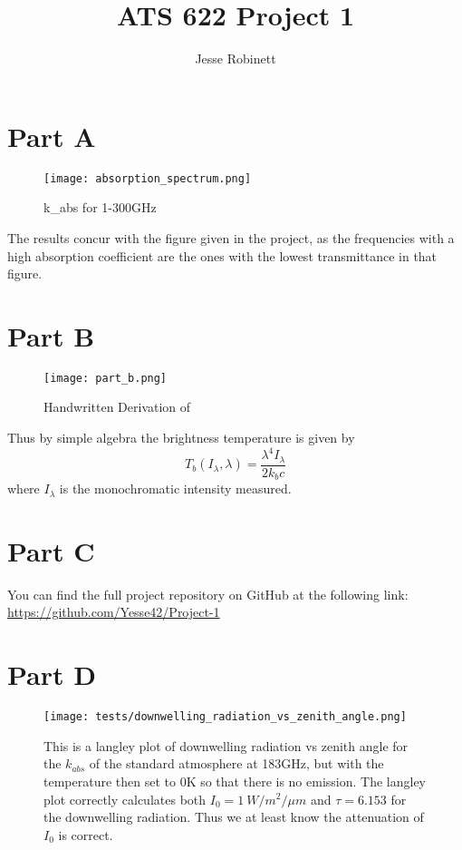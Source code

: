\documentclass{article}
\title{ATS 622 Project 1}
\author{Jesse Robinett}
\begin{document}
\maketitle

\section*{Part A}

\begin{figure}[H]
	\texttt{[image: absorption\_spectrum.png]}
    \caption{k\_abs for 1-300GHz}
\end{figure}

The results concur with the figure given in the project, as the frequencies with a high absorption coefficient are the ones with the lowest transmittance in that figure.

\section*{Part B}

\begin{figure}[H]
	\texttt{[image: part\_b.png]}
    \caption{Handwritten Derivation of }
\end{figure}

Thus by simple algebra the brightness temperature is given by $$ T_b(I_\lambda, \lambda) = \frac{\lambda^4 I_\lambda}{2k_bc}$$ where $ I_\lambda $ is the monochromatic intensity measured.

\section*{Part C}

You can find the full project repository on GitHub at the following link: 
\href{https://github.com/Yesse42/Project-1}{https://github.com/Yesse42/Project-1}

\section*{Part D}

\begin{figure}[H]
    \texttt{[image: tests/downwelling\_radiation\_vs\_zenith\_angle.png]}
    \caption{This is a langley plot of downwelling radiation vs zenith angle for the $k_{abs}$ of the standard atmosphere at 183GHz, but with the temperature then set to 0K so that there is no emission. The langley plot correctly calculates both $I_0 = \qty{1}{W/m^2/\mu m}$ and $\tau = 6.153$ for the downwelling radiation. Thus we at least know the attenuation of $I_0$ is correct.}
\end{figure}
\end{document}
